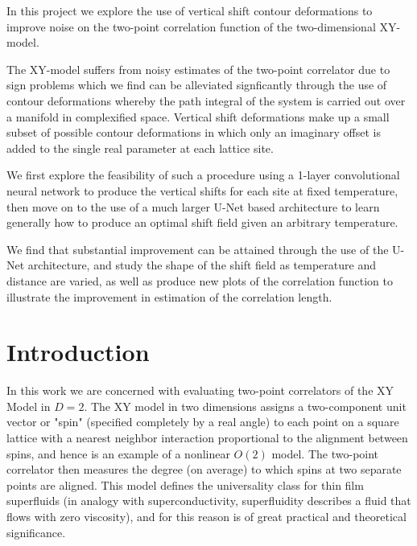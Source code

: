 \documentclass[12pt]{article}
\begin{document}
In this project we explore the use of vertical shift contour deformations to improve noise on the two-point correlation function of the
two-dimensional XY-model.

The XY-model suffers from noisy estimates of the two-point correlator due to sign problems which we find can be alleviated signficantly through
the use of contour deformations whereby the path integral of the system is carried out over a manifold in complexified space. Vertical shift deformations
make up a small subset of possible contour deformations in which only an imaginary offset is added to the single real parameter at each lattice site.

We first explore the feasibility of such a procedure using a 1-layer convolutional neural network to produce the vertical shifts for each site at fixed temperature,
then move on to the use of a much larger U-Net based architecture to learn generally how to produce an optimal shift field given an arbitrary temperature.

We find that substantial improvement can be attained through the use of the U-Net architecture, and study the shape of the shift field as temperature and
distance are varied, as well as produce new plots of the correlation function to illustrate the improvement in estimation of the correlation length.


\newpage

\tableofcontents

\newpage

\listoffigures
\listoftables

\newpage

\section{Introduction}

In this work we are concerned with evaluating two-point correlators of the XY Model in $D=2$. The XY model in two dimensions assigns a two-component unit vector or "spin"
(specified completely by a real angle) to each point on a square lattice with a nearest neighbor interaction proportional to the alignment between spins, and hence is an example of a 
nonlinear $O(2)$ model. The two-point correlator then measures the degree (on average) to which spins at two separate points are aligned.
This model defines the universality class for thin film superfluids (in analogy with superconductivity, superfluidity describes a fluid that flows with zero viscosity), 
and for this reason is of great practical and theoretical significance.
\end{document}
